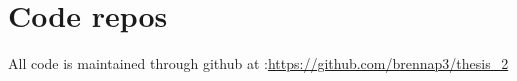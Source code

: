 \chapter{Code repos}

All code is maintained through github at :\url{https://github.com/brennap3/thesis_2}

